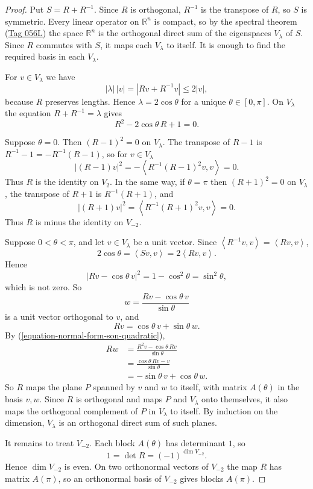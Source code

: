 \begin{proof}
Put $S=R+R^{-1}$. Since $R$ is orthogonal,
$R^{-1}$ is the transpose of $R$, so $S$ is
symmetric. Every linear operator on
$\mathbb{R}^n$ is compact, so by the
spectral theorem
(\href{https://www.heap-project.org/tag/056L}
{Tag 056L}) the space $\mathbb{R}^n$ is the
orthogonal direct sum of the eigenspaces
$V_\lambda$ of $S$. Since $R$ commutes with
$S$, it maps each $V_\lambda$ to itself.
It is enough to find the required basis in
each $V_\lambda$.

For $v \in V_\lambda$ we have
$$
|\lambda|\,|v|
=|Rv+R^{-1}v|
\leq 2|v|,
$$
because $R$ preserves lengths. Hence
$\lambda=2\cos\theta$ for a unique
$\theta \in [0,\pi]$. On $V_\lambda$ the
equation $R+R^{-1}=\lambda$ gives
\begin{equation}
\label{equation-normal-form-son-quadratic}
R^2-2\cos\theta\, R+1=0.
\end{equation}

Suppose $\theta=0$. Then
$(R-1)^2=0$ on $V_\lambda$. The transpose
of $R-1$ is $R^{-1}-1=-R^{-1}(R-1)$, so
for $v \in V_\lambda$
$$
|(R-1)v|^2
=-\left\langle{}
R^{-1}(R-1)^2v,v
\right\rangle{}
=0.
$$
Thus $R$ is the identity on $V_2$. In the
same way, if $\theta=\pi$ then
$(R+1)^2=0$ on $V_\lambda$, the transpose
of $R+1$ is $R^{-1}(R+1)$, and
$$
|(R+1)v|^2
=\left\langle{}
R^{-1}(R+1)^2v,v
\right\rangle{}
=0.
$$
Thus $R$ is minus the identity on $V_{-2}$.

Suppose $0<\theta<\pi$, and let
$v \in V_\lambda$ be a unit vector. Since
$\left\langle{} R^{-1}v,v \right\rangle{}
=\left\langle{} Rv,v \right\rangle{}$,
$$
2\cos\theta
=\left\langle{} Sv,v \right\rangle{}
=2\left\langle{} Rv,v \right\rangle{}.
$$
Hence
$$
|Rv-\cos\theta\, v|^2
=1-\cos^2\theta
=\sin^2\theta,
$$
which is not zero. So
$$
w=\frac{Rv-\cos\theta\, v}{\sin\theta}
$$
is a unit vector orthogonal to $v$, and
$$
Rv=\cos\theta\, v+\sin\theta\, w.
$$
By
(\ref{equation-normal-form-son-quadratic}),
$$
\begin{aligned}
Rw
&=\frac{R^2v-\cos\theta\, Rv}{\sin\theta}
\\
&=\frac{\cos\theta\, Rv-v}{\sin\theta}
\\
&=-\sin\theta\, v+\cos\theta\, w.
\end{aligned}
$$
So $R$ maps the plane $P$ spanned by $v$
and $w$ to itself, with matrix $A(\theta)$
in the basis $v,w$. Since $R$ is orthogonal
and maps $P$ and $V_\lambda$ onto
themselves, it also maps the orthogonal
complement of $P$ in $V_\lambda$ to itself.
By induction on the dimension, $V_\lambda$
is an orthogonal direct sum of such planes.

It remains to treat $V_{-2}$. Each block
$A(\theta)$ has determinant $1$, so
$$
1=\det R=(-1)^{\dim V_{-2}}.
$$
Hence $\dim V_{-2}$ is even. On two
orthonormal vectors of $V_{-2}$ the map $R$
has matrix $A(\pi)$, so an orthonormal
basis of $V_{-2}$ gives blocks $A(\pi)$.
\end{proof}

